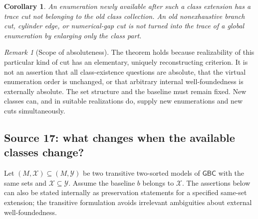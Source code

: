 \documentclass[11pt]{article}
\newtheorem{corollary}[corollary]{Corollary}
\theoremstyle{definition}
\theoremstyle{remark}
\newtheorem{remark}[remark]{Remark}
\newcommand{\GBC}{\mathsf{GBC}}
\begin{document}
\begin{corollary}\label{swo:tc:n7.3}
An enumeration newly available after such a class extension has a
trace cut not belonging to the old class collection. An old
nonexhaustive branch cut, cylinder edge, or numerical-gap cut is not
turned into the trace of a global enumeration by enlarging only the
class part.
\end{corollary}

\begin{remark}[Scope of absoluteness]\label{swo:tc:n7.4}
The theorem holds because realizability of this particular kind of cut
has an elementary, uniquely reconstructing criterion. It is not an
assertion that all class-existence questions are absolute, that the
virtual enumeration order is unchanged, or that arbitrary internal
well-foundedness is externally absolute. The set structure and the
baseline must remain fixed. New classes can, and in suitable
realizations do, supply new enumerations and new cuts simultaneously.
\end{remark}

\subsection{Source 17: what changes when the available classes change?}
\label{swo:gs:sec:class-extensions}

Let $(M,\mathcal X)\subseteq(M,\mathcal Y)$ be two transitive two-sorted
models of $\GBC$ with the same sets and $\mathcal X\subseteq\mathcal Y$.
Assume the baseline $b$ belongs to $\mathcal X$. The assertions below can
also be stated internally as preservation statements for a specified
same-set extension; the transitive formulation avoids irrelevant
ambiguities about external well-foundedness.
\end{document}
